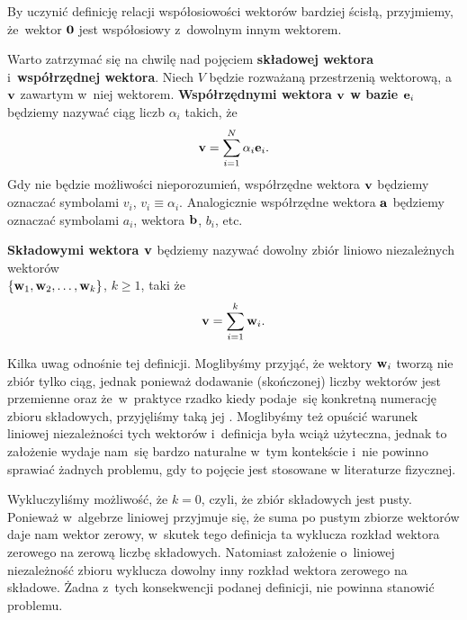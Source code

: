 \documentclass[a4paper,11pt]{article}
\numberwithin{equation}{section}
\begin{document}
\vspace{\spaceFour}



\noindent
{} By uczynić definicję relacji współosiowości wektorów bardziej
ścisłą, przyjmiemy, że~wektor $\mathbf{0}$ jest współosiowy z~dowolnym
innym wektorem.

\vspace{\spaceFour}





\noindent
{} Warto zatrzymać się na chwilę nad pojęciem \textbf{składowej
  wektora} i~\textbf{współrzędnej wektora}. Niech $V$ będzie rozważaną
przestrzenią wektorową, a~$\mathbf{v}$ zawartym w~niej wektorem.
\textbf{Współrzędnymi wektora $\mathbf{v}$ w bazie $\mathbf{e}_{ i }$}
będziemy nazywać ciąg liczb $\alpha_{ i }$ takich, że
\begin{equation}
  \label{eq:SkalmierskiMechanika-01}
  \mathbf{v} = \sum_{ i = 1 }^{ N } \alpha_{ i } \mathbf{e}_{ i }.
\end{equation}
Gdy nie będzie możliwości nieporozumień, współrzędne wektora $\mathbf{v}$
będziemy oznaczać symbolami $v_{ i }$, $v_{ i } \equiv \alpha_{ i }$. Analogicznie
współrzędne wektora $\mathbf{a}$ będziemy oznaczać symbolami $a_{ i }$,
wektora $\mathbf{b}$, $b_{ i }$, etc.

\textbf{Składowymi wektora $\mathbf{v}$} będziemy nazywać dowolny zbiór
liniowo niezależnych wektorów \\
$\{ \mathbf{w}_{ 1 }, \mathbf{w}_{ 2 }, \ldots, \mathbf{w}_{ k } \}$, $k \geq 1$, taki że
\begin{equation}
  \label{eq:SkalmierskiMechanika-02}
  \mathbf{v} = \sum_{ i = 1 }^{ k } \mathbf{w}_{ i }.
\end{equation}

Kilka uwag odnośnie tej definicji. Moglibyśmy przyjąć, że wektory
$\mathbf{w}_{ i }$ tworzą nie zbiór tylko ciąg, jednak ponieważ dodawanie
(skończonej) liczby wektorów jest przemienne oraz że~w~praktyce rzadko
kiedy podaje~się konkretną numerację zbioru składowych, przyjęliśmy taką
jej . Moglibyśmy też opuścić warunek liniowej niezależności tych
wektorów i~definicja była wciąż użyteczna, jednak to założenie wydaje
nam~się bardzo naturalne w~tym kontekście i~nie powinno sprawiać żadnych
problemu, gdy to pojęcie jest stosowane w literaturze fizycznej.

Wykluczyliśmy możliwość, że $k = 0$, czyli, że zbiór składowych jest pusty.
Ponieważ w~algebrze liniowej przyjmuje się, że suma po pustym zbiorze
wektorów daje nam wektor zerowy, w~skutek tego definicja ta wyklucza rozkład
wektora zerowego na zerową liczbę składowych. Natomiast założenie o~liniowej
niezależność zbioru wyklucza dowolny inny rozkład wektora zerowego na
składowe. Żadna z~tych konsekwencji podanej definicji, nie powinna stanowić
problemu.
\end{document}
